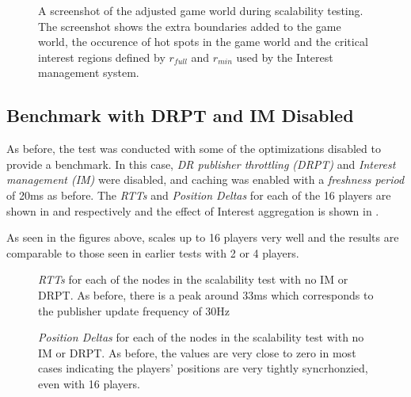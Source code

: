 \begin{figure}[H]
    \centering
    \caption{A screenshot of the adjusted game world during scalability testing. The screenshot shows the extra boundaries added to the game world, the occurence of hot spots in the game world and the critical interest regions defined by $r_{full}$ and $r_{min}$ used by the Interest management system.}
    \label{fig:eval:hotspotting}
\end{figure}


\subsection{Benchmark with DRPT and IM Disabled}
As before, the test was conducted with some of the optimizations disabled to provide a benchmark. In this case, \textit{DR publisher throttling (DRPT)} and \textit{Interest management (IM)} were disabled, and caching was enabled with a \textit{freshness period} of 20ms as before. The \textit{RTTs} and \textit{Position Deltas} for each of the 16 players are shown in  and  respectively and the effect of Interest aggregation is shown in .

As seen in the figures above, \game{} scales up to 16 players very well and the results are comparable to those seen in earlier tests with 2 or 4 players. 


\begin{figure}[H]
    \centering
    \caption{\textit{RTTs} for each of the nodes in the scalability test with no IM or DRPT. As before, there is a peak around 33ms which corresponds to the publisher update frequency of 30Hz}
    \label{fig:eval:no-im-no-dr:agg-packet-times}
\end{figure}

\begin{figure}[H]
    \centering
    \caption{\textit{Position Deltas} for each of the nodes in the scalability test with no IM or DRPT. As before, the values are very close to zero in most cases indicating the players' positions are very tightly syncrhonzied, even with 16 players.}
    \label{fig:eval:no-im-no-dr:agg-pos-deltas}
\end{figure}

